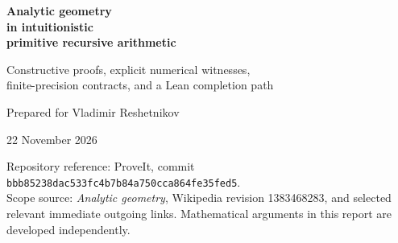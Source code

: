\documentclass[11pt,a4paper]{article}
\theoremstyle{definition}
\theoremstyle{remark}
\begin{document}
\begin{titlepage}
\vspace*{14mm}
{\color{ink}\Huge\bfseries Analytic geometry\\[3mm]in intuitionistic\\[3mm]primitive recursive arithmetic\par}
\vspace{12mm}
{\Large Constructive proofs, explicit numerical witnesses,\\ finite-precision contracts, and a Lean completion path\par}
\vspace{14mm}
{\large Prepared for Vladimir Reshetnikov\par}
{\large 22 November 2026\par}
\vspace{14mm}
\begin{abstract}
We develop a broad, explicitly constructive portion of coordinate geometry: affine incidence, metric identities, projections, intersections, conic classification, focal descriptions, quadrics, coordinate transformations, and quantitative tangency. Rational geometric data are encoded by natural numbers. Algebraic lengths and intersection points are supplied by bounded dyadic square-root procedures; analytic coordinate functions are represented by fixed primitive-recursive approximation families. Every division and case distinction is assigned an appropriate domain guard.

The intended arithmetic is first-order intuitionistic primitive recursive arithmetic with quantifier-free induction. No universal primitive-recursive evaluator, arbitrary-real sign oracle, unrestricted choice, or completeness axiom is assumed. The report supplies full mathematical arguments and an explicit translation discipline. It also supplies candidate Lean proofs in ProveIt's actual object-language proof type, together with definitions and remaining formalization obligations. The new Lean source has \textbf{not been compiled in this environment}; executable arithmetic and symbolic checks are separate evidence, not substitutes for formal proofs.
\end{abstract}
\vfill
{\small\color{muted}Repository reference: ProveIt, commit \texttt{bbb85238dac533fc4b7b84a750cca864fe35fed5}.\\
Scope source: \emph{Analytic geometry}, Wikipedia revision 1383468283, and selected relevant immediate outgoing links. Mathematical arguments in this report are developed independently.}
\end{titlepage}
\tableofcontents
\clearpage









\end{document}
